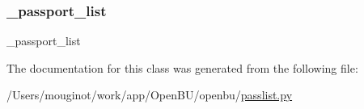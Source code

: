 \mbox{\label{classopenbu_1_1passlist_1_1_passlist_a22fc9cd7869e605116244aa35fb99afe}} 
\subsubsection{\texorpdfstring{\+\_\+passport\+\_\+list}{\_passport\_list}}
{\footnotesize\ttfamily \+\_\+passport\+\_\+list\hspace{0.3cm}{\ttfamily [private]}}



The documentation for this class was generated from the following file\+:\begin{DoxyCompactItemize}
\item 
/\+Users/mouginot/work/app/\+Open\+B\+U/openbu/\mbox{\hyperlink{passlist_8py}{passlist.\+py}}\end{DoxyCompactItemize}

